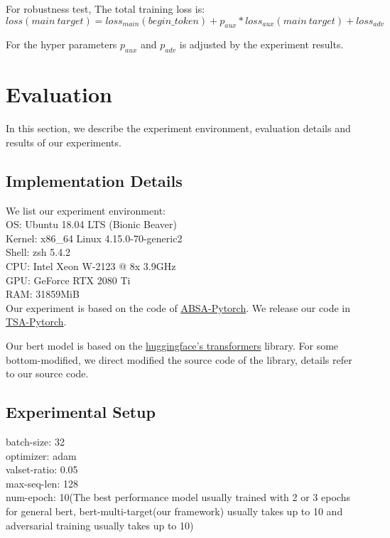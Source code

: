 \documentclass[fyp]{socreport}
\begin{document}
For robustness test, 
The total training loss is:  
\begin{equation}
    loss(main\ target)=loss_{main}(begin\_{token})+p_{aux}*loss_{aux}(main\ target)+loss_{adv}
\end{equation}


For the hyper parameters $p_{aux}$ and $p_{adv}$ is adjusted by the experiment results.

\chapter{Evaluation}
In this section, we describe the experiment environment, evaluation details and results of our experiments.

\section{Implementation Details}

We list our experiment environment: \\
OS: Ubuntu 18.04 LTS (Bionic Beaver)\\
Kernel: x86\_64 Linux 4.15.0-70-generic2\\
Shell: zsh 5.4.2\\
CPU: Intel Xeon W-2123 @ 8x 3.9GHz\\
GPU: GeForce RTX 2080 Ti\\
RAM: 31859MiB \\




Our experiment is based on the code of \href{https://github.com/songyouwei/ABSA-PyTorch}{ABSA-Pytorch}. We release our code in \href{https://github.com/Xiang-Pan/TSA-PyTorch}{TSA-Pytorch}.

Our bert model is based on the \href{https://github.com/huggingface/transformers}{huggingface's transformers} library. For some bottom-modified, we direct modified the source code of the library, details refer to our source code.

\section{Experimental Setup}

batch-size: 32\\
optimizer: adam\\
valset-ratio: 0.05\\
max-seq-len: 128\\
num-epoch: 10(The best performance model usually trained with 2 or 3 epochs for general bert, bert-multi-target(our framework) usually takes up to 10 and adversarial training usually takes up to 10)\\
\end{document}
